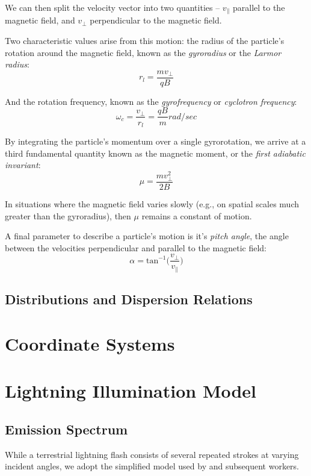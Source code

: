 We can then split the velocity vector into two quantities -- $v_\parallel$ parallel to the magnetic field, and $v_\perp$ perpendicular to the magnetic field.

Two characteristic values arise from this motion: the radius of the particle's rotation around the magnetic field, known as the \emph{gyroradius} or the \emph{Larmor radius}:
\begin{equation}
r_l = \frac{m v_\perp}{qB}
\end{equation}

And the rotation frequency, known as the \emph{gyrofrequency} or \emph{cyclotron frequency}:
\begin{equation}
\omega_c = \frac{v_\perp}{r_l} = \frac{q B}{m} \unit{rad/sec}
\end{equation}

By integrating the particle's momentum over a single gyrorotation, we arrive at a third fundamental quantity known as the magnetic moment, or the \emph{first adiabatic invariant}:
\begin{equation}
\mu = \frac{m v_\perp^2}{2B}
\label{eqn:mu}
\end{equation}

In situations where the magnetic field varies slowly (e.g., on spatial scales much greater than the gyroradius), then $\mu$ remains a constant of motion.

A final parameter to describe a particle's motion is it's \emph{pitch angle}, the angle between the velocities perpendicular and parallel to the magnetic field:
\begin{equation}
\alpha = \mathrm{tan}^{-1}\bigg(\frac{v_\perp}{v_\parallel}\bigg)
\end{equation}








\subsection{Distributions and Dispersion Relations}
\section{Coordinate Systems}
\section{Lightning Illumination Model}


\subsection{Emission Spectrum}
While a terrestrial lightning flash consists of several repeated strokes at varying incident angles, we adopt the simplified model used by \cite{Lauben1998} and subsequent workers.

